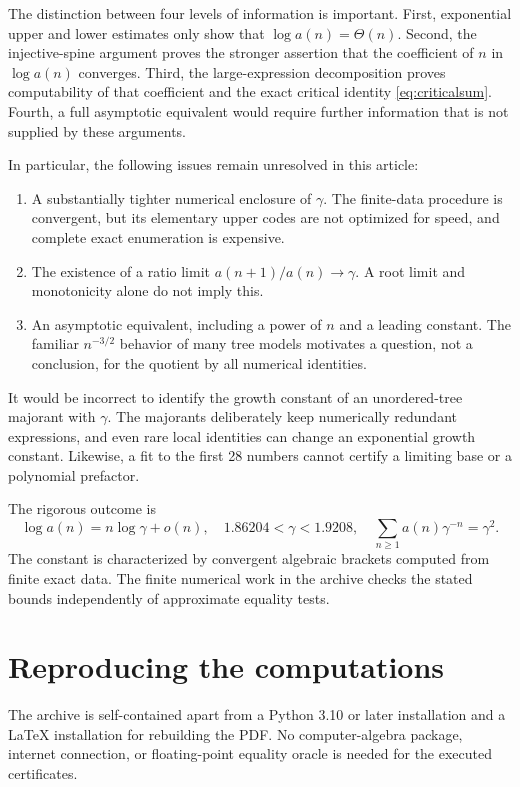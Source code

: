 \documentclass[11pt,letterpaper]{article}
\numberwithin{equation}{section}
\theoremstyle{definition}
\begin{document}
The distinction between four levels of information is important.
First, exponential upper and lower estimates only show that
$\log a(n)=\Theta(n)$.
Second, the injective-spine argument proves the stronger assertion that the
coefficient of $n$ in $\log a(n)$ converges.
Third, the large-expression decomposition proves computability of that
coefficient and the exact critical identity \eqref{eq:criticalsum}.
Fourth, a full asymptotic equivalent would require further information that
is not supplied by these arguments.

In particular, the following issues remain unresolved in this article:
\begin{enumerate}[label=(\roman*),itemsep=3pt]
\item A substantially tighter numerical enclosure of $\gamma$.
The finite-data procedure is convergent, but its elementary upper codes are
not optimized for speed, and complete exact enumeration is expensive.
\item The existence of a ratio limit $a(n+1)/a(n)\to\gamma$.
A root limit and monotonicity alone do not imply this.
\item An asymptotic equivalent, including a power of $n$ and a leading
constant. The familiar $n^{-3/2}$ behavior of many tree models motivates a
question, not a conclusion, for the quotient by all numerical identities.
\end{enumerate}

It would be incorrect to identify the growth constant of an unordered-tree
majorant with $\gamma$. The majorants deliberately keep numerically redundant
expressions, and even rare local identities can change an exponential growth
constant. Likewise, a fit to the first 28 numbers cannot certify a limiting
base or a polynomial prefactor.

The rigorous outcome is
\[
 \boxed{\log a(n)=n\log\gamma+o(n),\quad
 1.86204<\gamma<1.9208,\quad
 \sum_{n\ge1}a(n)\gamma^{-n}=\gamma^2.}
\]
The constant is characterized by convergent algebraic brackets computed from
finite exact data. The finite numerical work in the archive checks the stated
bounds independently of approximate equality tests.

\appendix
\section{Reproducing the computations}

The archive is self-contained apart from a Python 3.10 or later installation and a LaTeX
installation for rebuilding the PDF. No computer-algebra package, internet
connection, or floating-point equality oracle is needed for the executed
certificates.
\end{document}

